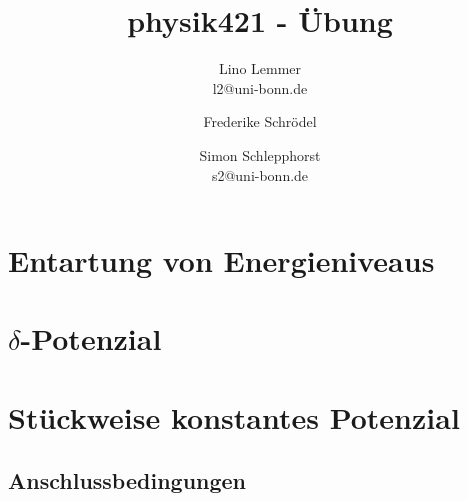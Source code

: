 

\setcounter{thezettel}{2}
\renewcommand\thesection{\arabic{thezettel}.\arabic{section}}

\title{physik421 - Übung }
\author{Lino Lemmer \\ \small{l2@uni-bonn.de} \and Frederike Schrödel \and Simon Schlepphorst\\ \small{s2@uni-bonn.de}}


\maketitle

\section{Entartung von Energieniveaus}

\section{$\delta$-Potenzial}

\section{Stückweise konstantes Potenzial}

\subsection{Anschlussbedingungen}

